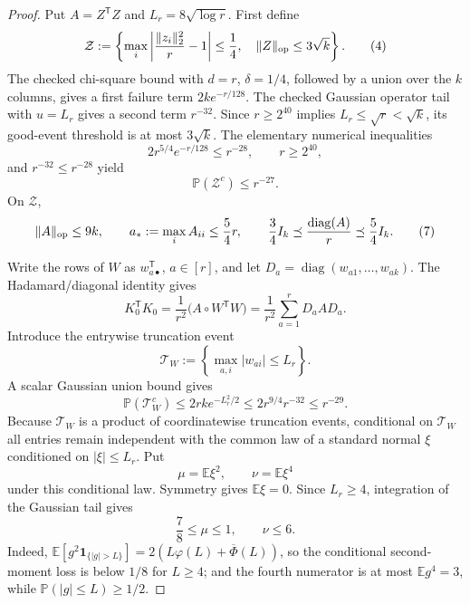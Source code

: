 \begin{proof}
Put \(A=Z^{\mathsf T}Z\) and
\(L_r=8\sqrt{\log r}\). First define
\[
  \mathcal Z
  :=\left\{
    \max_i\left|\frac{\|z_i\|_2^2}{r}-1\right|\le\frac14,
    \quad \|Z\|_{\rm op}\le3\sqrt k
  \right\}.                                                \tag{4}
\]
The checked chi-square bound with \(d=r\), \(\delta=1/4\), followed by a
union over the \(k\) columns, gives a first failure term
\(2ke^{-r/128}\). The checked Gaussian operator tail with \(u=L_r\) gives
a second term \(r^{-32}\). Since \(r\ge2^{40}\) implies
\(L_r\le\sqrt r<\sqrt k\), its good-event threshold is at most
\(3\sqrt k\). The elementary numerical inequalities
\[
  2r^{5/4}e^{-r/128}\le r^{-28},
  \qquad r\ge2^{40},                                       \tag{5}
\]
and \(r^{-32}\le r^{-28}\) yield
\[
  \mathbb P(\mathcal Z^c)\le r^{-27}.                     \tag{6}
\]
On \(\mathcal Z\),
\[
  \|A\|_{\rm op}\le9k,\qquad
  a_*:=\max_i A_{ii}\le\frac54r,\qquad
  \frac34I_k\preceq\frac{\operatorname{diag}(A)}r
    \preceq\frac54I_k.                                    \tag{7}
\]

Write the rows of \(W\) as \(w_{a\bullet}^{\mathsf T}\),
\(a\in[r]\), and let
\(D_a=\operatorname{diag}(w_{a1},\ldots,w_{ak})\). The Hadamard/diagonal
identity gives
\[
  K_0^{\mathsf T}K_0
  =\frac1{r^2}\bigl(A\circ W^{\mathsf T}W\bigr)
  =\frac1{r^2}\sum_{a=1}^r D_aAD_a.                        \tag{8}
\]
Introduce the entrywise truncation event
\[
  \mathcal T_W:=\left\{\max_{a,i}|w_{ai}|\le L_r\right\}.
\]
A scalar Gaussian union bound gives
\[
  \mathbb P(\mathcal T_W^c)
  \le2rk e^{-L_r^2/2}
  \le2r^{9/4}r^{-32}
  \le r^{-29}.                                             \tag{9}
\]
Because \(\mathcal T_W\) is a product of coordinatewise truncation events,
conditional on \(\mathcal T_W\) all entries remain independent with the
common law of a standard normal \(\xi\) conditioned on
\(|\xi|\le L_r\). Put
\[
  \mu=\mathbb E\xi^2,\qquad \nu=\mathbb E\xi^4
\]
under this conditional law. Symmetry gives \(\mathbb E\xi=0\). Since
\(L_r\ge4\), integration of the Gaussian tail gives
\[
  \frac78\le\mu\le1,\qquad \nu\le6.                     \tag{10}
\]
Indeed,
\(\mathbb E[g^2\mathbf1_{\{|g|>L\}}]
 =2(L\varphi(L)+\overline\Phi(L))\), so the conditional second-moment loss
is below \(1/8\) for \(L\ge4\); and the fourth numerator is at most
\(\mathbb Eg^4=3\), while
\(\mathbb P(|g|\le L)\ge1/2\).


\end{proof}
